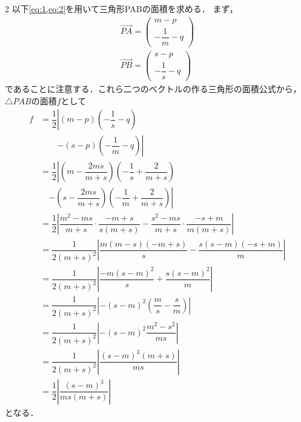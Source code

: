 \documentclass[../../main.tex]{subfiles}
\begin{document}
\begin{multicols}{2}
  以下\cref{eq:1,eq:2}を用いて三角形PABの面積を求める．
  まず，
  \begin{align}
    \overrightarrow{PA} =
    \begin{pmatrix} m - p \\ -\dfrac{1}{m} - q
    \end{pmatrix} \\
    \overrightarrow{PB} =
    \begin{pmatrix} s - p \\ -\dfrac{1}{s} - q
    \end{pmatrix}
  \end{align}
  であることに注意する．これら二つのベクトルの作る三角形の面積公式から，
  $\triangle PAB$の面積$f$として
  \begin{align}
    f
    & = \dfrac{1}{2} \left| (m-p)\left(-\dfrac{1}{s}-q\right) \right. \\
    &  \quad \quad \left. - (s-p)\left(-\dfrac{1}{m}-q\right) \right|  \nonumber \\
    & = \dfrac{1}{2} \left| \left(m-\dfrac{2ms}{m+s}\right)\left(-\dfrac{1}{s}+\dfrac{2}{m+s}\right) \right.  \nonumber                               \\
    & \quad \left. - \left(s-\dfrac{2ms}{m+s}\right)\left(-\dfrac{1}{m}+\dfrac{2}{m+s}\right) \right|\nonumber                                       \\
    & = \dfrac{1}{2} \left| \dfrac{m^2-ms}{m+s} \cdot \dfrac{-m+s}{s(m+s)} - \dfrac{s^2-ms}{m+s} \cdot \dfrac{-s+m}{m(m+s)} \right|     \nonumber      \\
    & = \dfrac{1}{2(m+s)^2} \left| \dfrac{m(m-s)(-m+s)}{s} - \dfrac{s(s-m)(-s+m)}{m} \right|           \nonumber                                     \\
    & = \dfrac{1}{2(m+s)^2} \left| \dfrac{-m(s-m)^2}{s} + \dfrac{s(s-m)^2}{m} \right|                           \nonumber                            \\
    & = \dfrac{1}{2(m+s)^2} \left| -(s-m)^2 \left( \dfrac{m}{s} - \dfrac{s}{m} \right) \right|                           \nonumber                   \\
    & = \dfrac{1}{2(m+s)^2} \left| -(s-m)^2 \dfrac{m^2-s^2}{ms} \right|                                                          \nonumber          \\
    & = \dfrac{1}{2(m+s)^2} \left|\dfrac{(s-m)^3 (m+s)}{ms}        \right|                                                                \nonumber \\
    & = \dfrac{1}{2} \left|\dfrac{(s-m)^3}{ms(m+s)}  \right| \label{eq:3}
  \end{align}
  となる．


\end{multicols}
\end{document}
